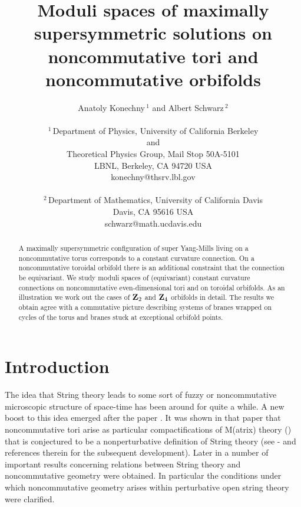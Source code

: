\documentclass[a4paper,a4paper]{article}
\begin{document}
\author{Anatoly Konechny${\,}^{1}$ and  Albert Schwarz${\,}^{2}$\\
 \\
${}^{1}\,$Department of Physics, University of California Berkeley \\
and \\
Theoretical Physics Group, Mail Stop 50A-5101\\
LBNL, Berkeley, CA 94720 USA \\ 
konechny@thsrv.lbl.gov\\
\\
${}^{2}\,$Department of Mathematics, University of California Davis\\
Davis, CA 95616 USA\\
  schwarz@math.ucdavis.edu}


\title{\bf Moduli spaces of maximally supersymmetric  solutions on noncommutative tori and 
noncommutative orbifolds }
\maketitle
\large
\begin{abstract}
\large
A maximally supersymmetric configuration of super Yang-Mills living on a noncommutative
torus corresponds to a constant curvature connection. On a noncommutative toroidal 
orbifold there is an additional constraint that the connection be equivariant. 
We study moduli spaces of (equivariant) constant curvature connections on 
noncommutative even-dimensional tori and on toroidal orbifolds. 
As an illustration we work out the cases of ${\bf Z}_{2}$ and ${\bf Z}_{4}$ orbifolds 
in detail. The results we obtain 
agree with a commutative picture describing   systems of branes wrapped on cycles of the torus and 
branes stuck at exceptional orbifold points.
\end{abstract}
\large
\section{Introduction}
The idea that String theory leads to some sort of fuzzy or noncommutative 
microscopic structure of space-time has been around for quite a while. 
 A new boost to this idea emerged  after  the paper \cite{CDS}. 
It was shown in that paper that noncommutative tori arise as particular compactifications 
of M(atrix) theory (\cite{BFSS}) that is conjectured to be a nonperturbative definition of 
String theory (see \cite{DougHull} - \cite{Schomerus} and references therein for  the subsequent development). 
Later in \cite{SeibWitt} a number of important results concerning relations between String theory 
and noncommutative geometry were obtained. In particular the conditions
under which noncommutative geometry arises within perturbative open string theory were clarified.  
\end{document}
